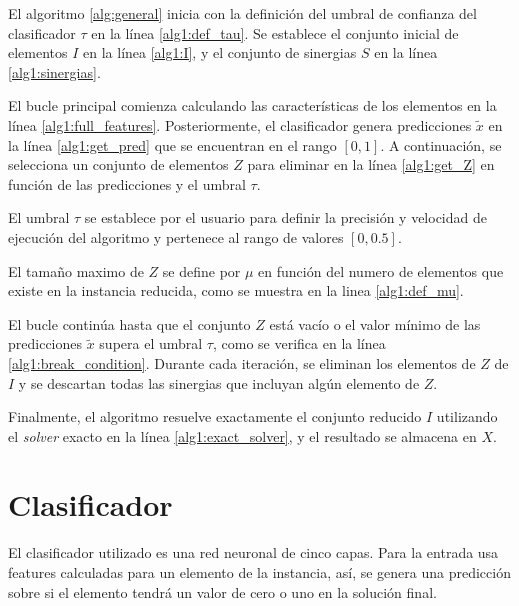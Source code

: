 \documentclass[spanish, a4paper, 12pt, openany,final]{book}
\begin{document}
El algoritmo \ref{alg:general} inicia con la definición del umbral de confianza del clasificador $\tau$ en la línea \ref{alg1:def_tau}. Se establece el conjunto inicial de elementos $I$ en la línea \ref{alg1:I}, y el conjunto de sinergias $S$ en la línea \ref{alg1:sinergias}.

El bucle principal comienza calculando las características de los elementos en la línea \ref{alg1:full_features}. Posteriormente, el clasificador genera predicciones $\tilde{x}$ en la línea \ref{alg1:get_pred} que se encuentran en el rango $[0,1]$. A continuación, se selecciona un conjunto de elementos $Z$ para eliminar en la línea \ref{alg1:get_Z} en función de las predicciones y el umbral $\tau$.

El umbral $\tau$ se establece por el usuario para definir la precisión y velocidad de ejecución del algoritmo y pertenece al rango de valores $[0,0.5]$.

El tamaño maximo de $Z$ se define por $\mu$ en función del numero de elementos que existe en la instancia reducida, como se muestra en la linea \ref{alg1:def_mu}.

El bucle continúa hasta que el conjunto $Z$ está vacío o el valor mínimo de las predicciones $\tilde{x}$ supera el umbral $\tau$, como se verifica en la línea \ref{alg1:break_condition}. Durante cada iteración, se eliminan los elementos de $Z$ de $I$ y se descartan todas las sinergias que incluyan algún elemento de $Z$.

Finalmente, el algoritmo resuelve exactamente el conjunto reducido $I$ utilizando el \textit{solver} exacto en la línea \ref{alg1:exact_solver}, y el resultado se almacena en $X$.


\section{Clasificador}

El clasificador utilizado es una red neuronal de cinco capas. Para la entrada usa features calculadas para un elemento de la instancia, así, se genera una predicción sobre si el elemento tendrá un valor de cero o uno en la solución final.
\end{document}
